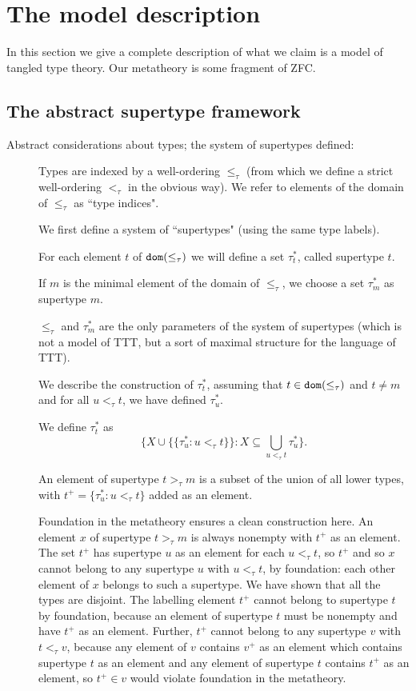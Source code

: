 \documentclass[112pt]{article}
\begin{document}
\newpage

\section{The model description}


In this section we give a complete description of what we claim is a model of tangled type theory.  Our metatheory is some fragment of ZFC.

\subsection{The abstract supertype framework}

\begin{description}
\item[Abstract considerations about types; the system of supertypes defined:]  Types are indexed by a well-ordering $\leq_\tau$ (from which we define a strict well-ordering $<_\tau$ in the obvious way).
We refer to elements of the domain of $\leq_\tau$ as ``type indices".

We first define a system of ``supertypes" (using the same type labels).

For each element $t$ of ${\tt dom}(\leq_\tau)$ we will define a set $\tau^*_t$, called supertype $t$.

If $m$ is the minimal element of the domain of $\leq_\tau$, we choose a set $\tau^*_m$ as supertype $m$.

$\leq_\tau$ and $\tau^*_m$ are the only parameters of the system of supertypes (which is not a model of TTT, but a sort of maximal structure for the language of TTT).

We describe the construction of $\tau^*_t$, assuming that $t \in {\tt dom}(\leq_\tau)$ and $t \neq m$ and for all $u <_\tau t$, we have
defined $\tau^*_u$.

We define $\tau^*_t$ as $$\{X \cup \{\{\tau^*_u:u <_\tau t\}\}:X \subseteq \bigcup_{u <_\tau t}\tau^*_u\}.$$

An element of supertype $t>_\tau m$ is a subset of the union of all lower types, with $t^+ = \{\tau^*_u:u <_\tau t\}$ added as an element.

Foundation in the metatheory ensures a clean construction here.  An element $x$ of supertype $t>_\tau m$ is always nonempty with $t^+$ as an element.  The set $t^+$ has supertype $u$ as an element for each $u <_\tau t$, so $t^+$ and so $x$  cannot belong to any supertype $u$ with $u <_\tau t$, by foundation:  each other element of $x$ belongs to such a supertype.  We have shown that all the types are disjoint.  The labelling element $t^+$ cannot belong to supertype $t$ by foundation, because an element of supertype $t$ must be nonempty and have $t^+$ as an element.  Further, $t^+$ cannot belong to any supertype $v$ with $t <_\tau v$, because any element of $v$ contains $v^+$ as an element which contains supertype $t$ as an element and any element of supertype $t$ contains $t^+$ as an element, so $t^+ \in v$ would violate foundation in the metatheory.


\end{description}
\end{document}
